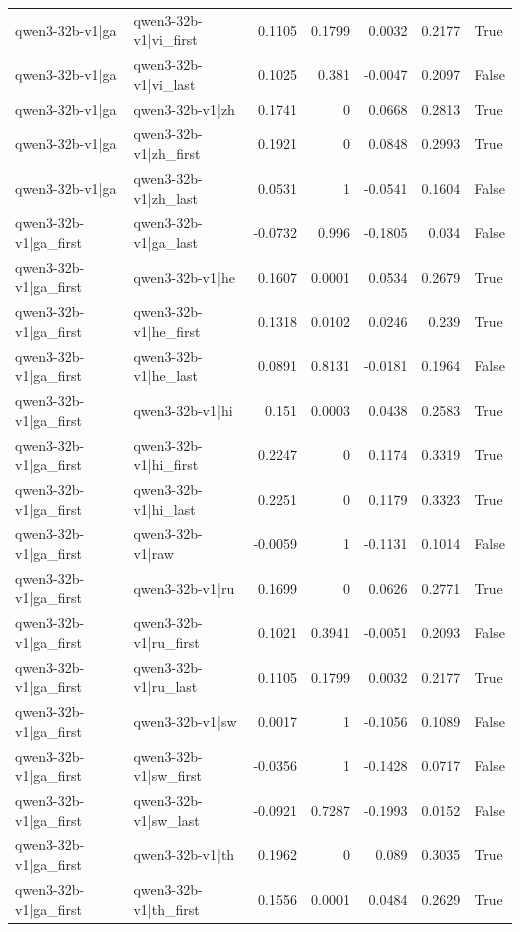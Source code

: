 \begin{table}
\begin{tabular}{l l r r r r l}
qwen3-32b-v1|ga & qwen3-32b-v1|vi_first & 0.1105 & 0.1799 & 0.0032 & 0.2177 & True \\
qwen3-32b-v1|ga & qwen3-32b-v1|vi_last & 0.1025 & 0.381 & -0.0047 & 0.2097 & False \\
qwen3-32b-v1|ga & qwen3-32b-v1|zh & 0.1741 & 0 & 0.0668 & 0.2813 & True \\
qwen3-32b-v1|ga & qwen3-32b-v1|zh_first & 0.1921 & 0 & 0.0848 & 0.2993 & True \\
qwen3-32b-v1|ga & qwen3-32b-v1|zh_last & 0.0531 & 1 & -0.0541 & 0.1604 & False \\
qwen3-32b-v1|ga_first & qwen3-32b-v1|ga_last & -0.0732 & 0.996 & -0.1805 & 0.034 & False \\
qwen3-32b-v1|ga_first & qwen3-32b-v1|he & 0.1607 & 0.0001 & 0.0534 & 0.2679 & True \\
qwen3-32b-v1|ga_first & qwen3-32b-v1|he_first & 0.1318 & 0.0102 & 0.0246 & 0.239 & True \\
qwen3-32b-v1|ga_first & qwen3-32b-v1|he_last & 0.0891 & 0.8131 & -0.0181 & 0.1964 & False \\
qwen3-32b-v1|ga_first & qwen3-32b-v1|hi & 0.151 & 0.0003 & 0.0438 & 0.2583 & True \\
qwen3-32b-v1|ga_first & qwen3-32b-v1|hi_first & 0.2247 & 0 & 0.1174 & 0.3319 & True \\
qwen3-32b-v1|ga_first & qwen3-32b-v1|hi_last & 0.2251 & 0 & 0.1179 & 0.3323 & True \\
qwen3-32b-v1|ga_first & qwen3-32b-v1|raw & -0.0059 & 1 & -0.1131 & 0.1014 & False \\
qwen3-32b-v1|ga_first & qwen3-32b-v1|ru & 0.1699 & 0 & 0.0626 & 0.2771 & True \\
qwen3-32b-v1|ga_first & qwen3-32b-v1|ru_first & 0.1021 & 0.3941 & -0.0051 & 0.2093 & False \\
qwen3-32b-v1|ga_first & qwen3-32b-v1|ru_last & 0.1105 & 0.1799 & 0.0032 & 0.2177 & True \\
qwen3-32b-v1|ga_first & qwen3-32b-v1|sw & 0.0017 & 1 & -0.1056 & 0.1089 & False \\
qwen3-32b-v1|ga_first & qwen3-32b-v1|sw_first & -0.0356 & 1 & -0.1428 & 0.0717 & False \\
qwen3-32b-v1|ga_first & qwen3-32b-v1|sw_last & -0.0921 & 0.7287 & -0.1993 & 0.0152 & False \\
qwen3-32b-v1|ga_first & qwen3-32b-v1|th & 0.1962 & 0 & 0.089 & 0.3035 & True \\
qwen3-32b-v1|ga_first & qwen3-32b-v1|th_first & 0.1556 & 0.0001 & 0.0484 & 0.2629 & True \\

\end{tabular}
\end{table}
